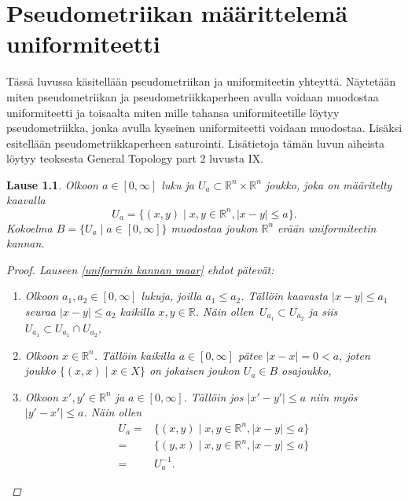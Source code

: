 \documentclass[12pt,a4paper,leqno]{report}
\newcommand{\R}{\mathbb{R}}
\theoremstyle{plain}
\newtheorem{lause}[equation]{Lause}
\theoremstyle{definition}
\theoremstyle{remark}
\begin{document}
\chapter{Pseudometriikan määrittelemä uniformiteetti}\label{luku_pseudo_uniformi}
Tässä luvussa käsitellään pseudometriikan ja uniformiteetin yhteyttä. 
Näytetään miten pseudometriikan ja pseudometriikkaperheen avulla voidaan muodostaa uniformiteetti 
ja toisaalta miten mille tahansa uniformiteetille löytyy pseudometriikka, 
jonka avulla kyseinen uniformiteetti voidaan muodostaa. 
Lisäksi esitellään pseudometriikkaperheen saturointi. 
Lisätietoja tämän luvun aiheista löytyy teoksesta General Topology part 2 \cite{Eom2} luvusta IX.
\begin{lause}
Olkoon $a\in[0,\infty]$ luku ja $U_a\subset \R^n\times\R^n$ joukko, 
joka on määritelty kaavalla
$$U_a=\{ (x,y)\mid x,y\in\R^n,|x-y|\leq a\}.$$
Kokoelma $B=\{U_a\mid a\in[0,\infty]\}$ muodostaa 
joukon $\R^n$ erään uniformiteetin kannan.
\begin{proof}
Lauseen \ref{uniformin kannan maar} ehdot pätevät:
\begin{enumerate} [label=(B\arabic*)]
\item %
Olkoon $a_1,a_2\in[0,\infty]$ lukuja, joilla $a_1\leq a_2$. Tällöin kaavasta $|x-y|\leq a_1$ seuraa $|x-y|\leq a_2$ kaikilla $x,y\in\R$. Näin ollen $\, U_{a_1}\subset U_{a_2}$ ja siis $U_{a_1}\subset U_{a_1}\cap U_{a_2}$,
\item%
Olkoon $x\in\R^n$. Tällöin kaikilla $a\in[0,\infty]$ pätee $|x-x|=0< a$, joten joukko $\{(x,x)\mid x\in X\}$ on jokaisen joukon $U_a\in B$ osajoukko,
\item%
Olkoon $x',y'\in\R^n$ ja $a\in[0,\infty]$. Tällöin jos $|x'-y'|\leq a$ niin myös $|y'-x'|\leq a$. Näin ollen 
\begin{align*}
U_a=&\{ (x,y)\mid x,y\in\R^n,|x-y|\leq a\}\\
=&\{ (y,x)\mid x,y\in\R^n,|x-y|\leq a\}\\
=&U_a^{-1}.
\end{align*}

\end{enumerate}
\end{proof}
\end{lause}
\end{document}

